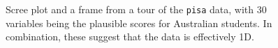 \documentclass[
  letterpaper,
]{krantz}
\begin{document}
\begin{figure}

\begin{minipage}{0.50\linewidth}



\end{minipage}%
%
\begin{minipage}{0.50\linewidth}



\end{minipage}%

\caption{\label{fig-pisa-pca-pdf}Scree plot and a frame from a tour of
the \texttt{pisa} data, with 30 variables being the plausible scores for
Australian students. In combination, these suggest that the data is
effectively 1D. }

\end{figure}%
\end{document}
